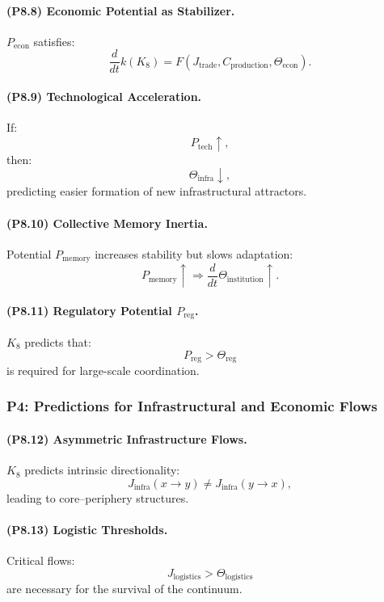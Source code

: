 \paragraph{(P8.8) Economic Potential as Stabilizer.}
$P_{\mathrm{econ}}$ satisfies:
\[
\frac{d}{dt} k(K_8) 
= F(J_{\mathrm{trade}}, C_{\mathrm{production}}, \Theta_{\mathrm{econ}}).
\]

\paragraph{(P8.9) Technological Acceleration.}
If:
\[
P_{\mathrm{tech}} \uparrow,
\]
then:
\[
\Theta_{\mathrm{infra}} \downarrow,
\]
predicting easier formation of new infrastructural attractors.

\paragraph{(P8.10) Collective Memory Inertia.}
Potential $P_{\mathrm{memory}}$ increases stability but slows adaptation:
\[
P_{\mathrm{memory}} \uparrow 
\Rightarrow 
\frac{d}{dt} \Theta_{\mathrm{institution}} \uparrow.
\]

\paragraph{(P8.11) Regulatory Potential $P_{\mathrm{reg}}$.}
$K_8$ predicts that:
\[
P_{\mathrm{reg}} > \Theta_{\mathrm{reg}}
\]
is required for large-scale coordination.

\subsubsection{P4: Predictions for Infrastructural and Economic Flows}

\paragraph{(P8.12) Asymmetric Infrastructure Flows.}
$K_8$ predicts intrinsic directionality:
\[
J_{\mathrm{infra}}(x \to y) 
\neq 
J_{\mathrm{infra}}(y \to x),
\]
leading to core–periphery structures.

\paragraph{(P8.13) Logistic Thresholds.}
Critical flows:
\[
J_{\mathrm{logistics}} > \Theta_{\mathrm{logistics}}
\]
are necessary for the survival of the continuum.

